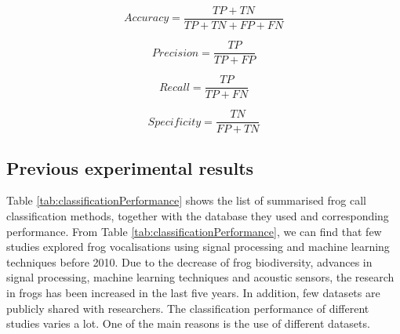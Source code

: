 \begin{equation}
Accuracy = \frac{TP+TN}{TP+TN+FP+FN}
\end{equation}

\begin{equation}
Precision = \frac{TP}{TP+FP}
\end{equation}

\begin{equation}
Recall = \frac{TP}{TP+FN}
\end{equation}

\begin{equation}
Specificity = \frac{TN}{FP+TN}
\end{equation}


\subsection{Previous experimental results}


Table \ref{tab:classificationPerformance} shows the list of summarised frog call classification methods, together with the database they used and corresponding performance. From Table \ref{tab:classificationPerformance}, we can find that few studies explored frog vocalisations using signal processing and machine learning techniques before 2010. Due to the decrease of frog biodiversity, advances in signal processing, machine learning techniques and acoustic sensors, the research in frogs has been increased in the last five years. In addition, few datasets are publicly shared with researchers. The classification performance of different studies varies a lot. One of the main reasons is the use of different datasets. 



